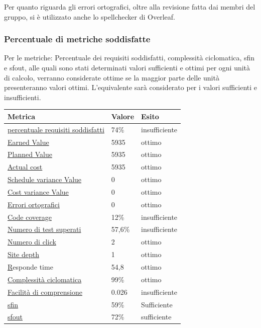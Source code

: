 Per quanto riguarda gli errori ortografici, oltre alla revisione fatta dai membri del gruppo, si è utilizzato anche lo spellchecker di Overleaf.

\newpage
\subsubsection{Percentuale di metriche soddisfatte}
    Per le metriche: Percentuale dei requisiti soddisfatti, complessità ciclomatica, sfin e sfout, alle quali sono stati determinati valori sufficienti e ottimi per ogni unità di calcolo,
    verranno considerate ottime se la maggior parte delle unità presenteranno valori ottimi. L'equivalente
    sarà considerato per i valori sufficienti e insufficienti. 


    \begin{longtabu} to \textwidth {| X[0.2,c m] | X[0.1,c m] | X[0.1,c m] |}
        \hline
        \textbf{Metrica} &
        \textbf{Valore} &
        \textbf{Esito}\\
        \hline
        \hyperlink{subsubsection.5.1.1}{percentuale requisiti soddisfatti}& 74\% & insufficiente \\ 
        \hline
        \hyperlink{subsubsection.5.1.2}{Earned Value} & 5935 & ottimo  \\ 
        \hline
        \hyperlink{subsubsection.5.1.2}{Planned Value} & 5935 & ottimo  \\
        \hline
        \hyperlink{subsubsection.5.1.2}{Actual cost} & 5935 & ottimo  \\
        \hline
        \hyperlink{subsubsection.5.1.2}{Schedule variance Value} & 0 & ottimo  \\
        \hline
        \hyperlink{subsubsection.5.1.2}{Cost variance Value} & 0 & ottimo  \\
        \hline
        \hyperlink{subsubsection.5.2.1}{Errori ortografici} & 0 & ottimo  \\
        \hline
        \hyperlink{subsubsection.5.2.4}{Code coverage} & 12\% & insufficiente \\
        \hline
        \hyperlink{subsubsection.5.2.5}{Numero di test superati} & 57,6\% & insufficiente \\
        \hline
        \hyperlink{subsubsection.5.3.1}{Numero di click} & 2 & ottimo \\
        \hline
        \hyperlink{subsubsection.5.3.2}{Site depth} & 1 & ottimo \\
        \hline
        \hyperlink{subsubsection.5.3.3}Responde time & 54,8 & ottimo \\
        \hline
        \hyperlink{subsubsection.5.3.4}{Complessità ciclomatica} & 99\% & ottimo \\
        \hline
        \hyperlink{subsubsection.5.3.5}{Facilità di comprensione} & 0.026 & insufficiente \\
        \hline
        \hyperlink{subsubsection.5.3.6}{sfin} & 59\% & Sufficiente \\
        \hline
        \hyperlink{subsubsection.5.3.6}{sfout} & 72\% & sufficiente \\
        \hline
        
        \end{longtabu}

